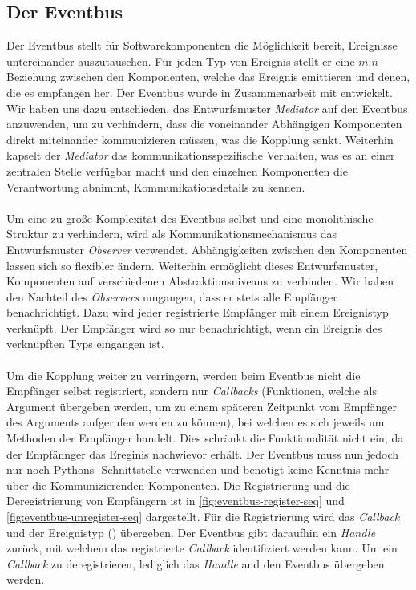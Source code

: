 \subsection{Der Eventbus}

Der Eventbus stellt für Softwarekomponenten die Möglichkeit bereit, Ereignisse untereinander auszutauschen. Für jeden Typ von Ereignis stellt er eine $m$:$n$-Beziehung zwischen den Komponenten, welche das Ereignis emittieren und denen, die es empfangen her. Der Eventbus wurde in Zusammenarbeit mit \citeauthor{persitzky_fehlerinjektion_2023} entwickelt. Wir haben uns dazu entschieden, das Entwurfsmuster \emph{Mediator} auf den Eventbus anzuwenden, um zu verhindern, dass die voneinander Abhängigen Komponenten direkt miteinander kommunizieren müssen, was die Kopplung senkt. Weiterhin kapselt der \emph{Mediator} das kommunikationsspezifische Verhalten, was es an einer zentralen Stelle verfügbar macht und den einzelnen Komponenten die Verantwortung abnimmt, Kommunikationsdetails zu kennen.\\
\\
Um eine zu große Komplexität des Eventbus selbst und eine monolithische Struktur zu verhindern, wird als Kommunikationsmechanismus das Entwurfsmuster \emph{Observer} verwendet. Abhängigkeiten zwischen den Komponenten lassen sich so flexibler ändern. Weiterhin ermöglicht dieses Entwurfsmuster, Komponenten auf verschiedenen Abstraktionsniveaus zu verbinden. Wir haben den Nachteil des \emph{Observers} umgangen, dass er stets alle Empfänger benachrichtigt. Dazu wird jeder registrierte Empfänger mit einem Ereignistyp verknüpft. Der Empfänger wird so nur benachrichtigt, wenn ein Ereignis des verknüpften Typs eingangen ist.\\
\\
Um die Kopplung weiter zu verringern, werden beim Eventbus nicht die Empfänger selbst registriert, sondern nur \emph{Callbacks} (Funktionen, welche als Argument übergeben werden, um zu einem späteren Zeitpunkt vom Empfänger des Arguments aufgerufen werden zu können), bei welchen es sich jeweils um Methoden der Empfänger handelt. Dies schränkt die Funktionalität nicht ein, da der Empfännger das Ereginis nachwievor erhält. Der Eventbus muss nun jedoch nur noch Pythons -Schnittstelle verwenden und benötigt keine Kenntnis mehr über die Kommunizierenden Komponenten. Die Registrierung und die Deregistrierung von Empfängern ist in \autoref{fig:eventbus-register-seq} und \autoref{fig:eventbus-unregister-seq} dargestellt. Für die Registrierung wird das \emph{Callback} und der Ereignistyp () übergeben. Der Eventbus gibt daraufhin ein \emph{Handle} zurück, mit welchem das registrierte \emph{Callback} identifiziert werden kann. Um ein \emph{Callback} zu deregistrieren, lediglich das \emph{Handle} and den Eventbus übergeben werden.

